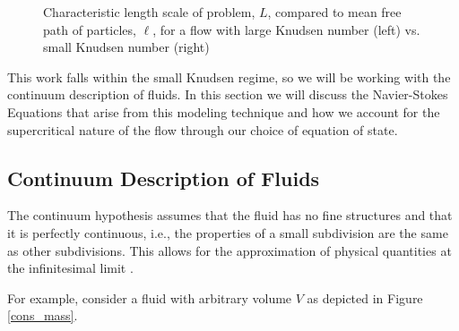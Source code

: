 \begin{figure}[h!]
\begin{center}
\end{center}
\caption{Characteristic length scale of problem, $L$, compared to mean free path of particles, $\ell$, for a flow with large Knudsen number (left) vs. small Knudsen number (right)}
\label{Knudsen_example}
\end{figure}

This work falls within the small Knudsen regime, so we will be working with the continuum description of fluids. In this section we will discuss the Navier-Stokes Equations that arise from this modeling technique and how we account for the supercritical nature of the flow through our choice of equation of state. 

\subsection{Continuum Description of Fluids}
The continuum hypothesis assumes that the fluid has no fine structures and that it is perfectly continuous, i.e., the properties of a small subdivision are the same as other subdivisions. This allows for the approximation of physical quantities at the infinitesimal limit \cite{cont}.

For example, consider a fluid with arbitrary volume $V$ as depicted in Figure \ref{cons_mass}.  

